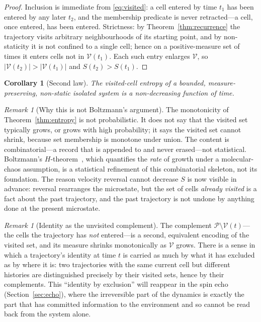 \documentclass[11pt,a4paper]{article}
\theoremstyle{thmstyle}
\newtheorem{corollary}[theorem]{Corollary}
\theoremstyle{definition}
\theoremstyle{remark}
\newtheorem{remark}[theorem]{Remark}
\newcommand{\Vis}{\mathcal{V}}
\begin{document}
\begin{proof}
Inclusion is immediate from \eqref{eq:visited}: a cell entered by time
$t_1$ has been entered by any later $t_2$, and the membership predicate is
never retracted---a cell, once entered, has been entered. Strictness: by
Theorem~\ref{thm:recurrence} the trajectory visits arbitrary
neighbourhoods of its starting point, and by non-staticity it is not
confined to a single cell; hence on a positive-measure set of times it
enters cells not in $\Vis(t_1)$. Each such entry enlarges $\Vis$, so
$|\Vis(t_2)|>|\Vis(t_1)|$ and $S(t_2)>S(t_1)$.
\end{proof}

\begin{corollary}[Second law]
\label{cor:secondlaw}
The visited-cell entropy of a bounded, measure-preserving, non-static
isolated system is a non-decreasing function of time.
\end{corollary}

\begin{remark}[Why this is not Boltzmann's argument]
\label{rem:notboltzmann}
The monotonicity of Theorem~\ref{thm:entropy} is not probabilistic. It
does not say that the visited set typically grows, or grows with high
probability; it says the visited set cannot shrink, because set membership
is monotone under union. The content is combinatorial---a record that is
appended to and never erased---not statistical. Boltzmann's
$H$-theorem~\citep{boltzmann1877}, which quantifies the \emph{rate} of
growth under a molecular-chaos assumption, is a statistical refinement of
this combinatorial skeleton, not its foundation. The reason velocity
reversal cannot decrease $S$ is now visible in advance: reversal
rearranges the microstate, but the set of cells \emph{already visited} is
a fact about the past trajectory, and the past trajectory is not undone by
anything done at the present microstate.
\end{remark}

\begin{remark}[Identity as the unvisited complement]
\label{rem:negation}
The complement $\mathcal{P}\setminus\Vis(t)$---the cells the trajectory
has \emph{not} entered---is a second, equivalent encoding of the visited
set, and its measure shrinks monotonically as $\Vis$ grows. There is a
sense in which a trajectory's identity at time $t$ is carried as much by
what it has excluded as by where it is: two trajectories with the same
current cell but different histories are distinguished precisely by their
visited sets, hence by their complements. This ``identity by exclusion''
will reappear in the spin echo (Section~\ref{sec:echo}), where the
irreversible part of the dynamics is exactly the part that has committed
information to the environment and so cannot be read back from the system
alone.
\end{remark}
\end{document}
